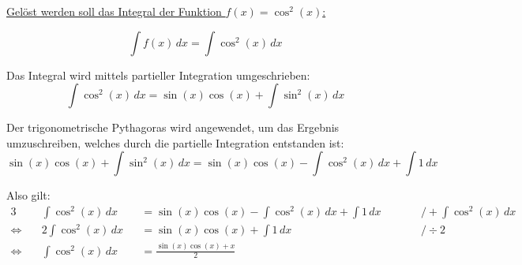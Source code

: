 \documentclass[12pt,a4paper]{article}
\begin{document}
    \setlength{\parindent}{0mm}
    \setcounter{tocdepth}{4}
    \pagestyle{empty}

    \underline{Gelöst werden soll das Integral der Funktion $f(x) = \cos^2(x)$:}

    \vspace{1cm}
    \begin{equation*}
        \int f(x) \, dx = \int \cos^2(x) \, dx
    \end{equation*}

    Das Integral wird mittels partieller Integration umgeschrieben:
    \begin{equation*}
        \int \cos^2(x) \, dx = \sin(x)\cos(x) + \int \sin^2(x) \, dx
    \end{equation*}

    Der trigonometrische Pythagoras wird angewendet, um das Ergebnis umzuschreiben, welches durch die partielle Integration entstanden ist:
    \begin{equation*}
        \sin(x)\cos(x) + \int \sin^2(x) \, dx = \sin(x)\cos(x) - \int \cos^2(x) \, dx + \int 1 \, dx
    \end{equation*}

    Also gilt:
    \begin{alignat*}{3}
        & \int \cos^2(x) \, dx &&= \sin(x)\cos(x) - \int \cos^2(x) \, dx + \int 1 \, dx && \qquad\Big / + \int \cos^2(x) \, dx \\
        \Leftrightarrow\quad & 2 \int \cos^2(x) \, dx &&= \sin(x)\cos(x) + \int 1 \, dx && \qquad\Big / \div 2 \\
        \Leftrightarrow\quad & \int \cos^2(x) \, dx &&= \frac{\sin(x)\cos(x) + x}{2}
    \end{alignat*}
\end{document}
